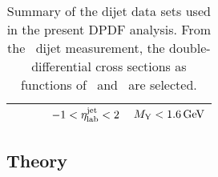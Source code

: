 \documentclass[12pt]{article}
\begin{document}
\begin{table*}[tbhp]
\begin{center}
\begin{tabular}{ccccc}
            & & & $-1<\eta_{\rm lab}^{\rm jet}<2$ & $M_{\rm Y}<1.6 \, \mathrm{GeV}$ \\
      \hline
    \end{tabular}
    \caption{
      Summary of the dijet data sets used in the present DPDF analysis.
      From the \HLRG\ dijet measurement, the double-differential cross sections as functions of \Qsq\ and \meanpt\ are selected.
    }
    \label{tab:datasetsJets}
    \end{center}
\end{table*}



\begin{boldmath}
\section{Theory}
\end{boldmath}
\label{sec:theory}
\end{document}
